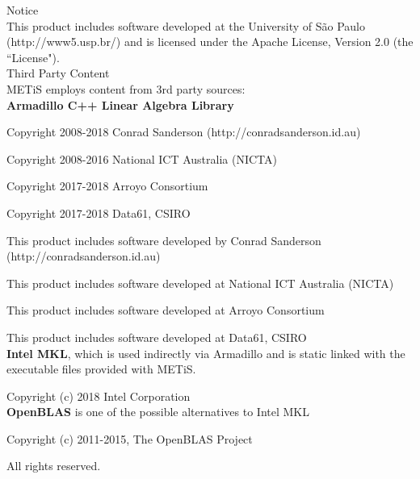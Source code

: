 {\selectfont \LARGE Notice} \\[8pt]
%
This product includes software developed at the University of São Paulo (http://www5.usp.br/) and is licensed under the Apache License, Version 2.0 (the ``License"). \\[24pt]




{ \selectfont\LARGE Third Party Content} \\[8pt]
METiS employs content from 3rd party sources: \\[16pt]
%
\textbf{Armadillo C++ Linear Algebra Library}

Copyright 2008-2018 Conrad Sanderson (http://conradsanderson.id.au)

Copyright 2008-2016 National ICT Australia (NICTA)

Copyright 2017-2018 Arroyo Consortium

Copyright 2017-2018 Data61, CSIRO

This product includes software developed by Conrad Sanderson 
(http://conradsanderson.id.au)

This product includes software developed at National ICT Australia (NICTA)

This product includes software developed at Arroyo Consortium

This product includes software developed at Data61, CSIRO \\[24pt]
%
%
%
\textbf{Intel MKL}, which is used indirectly via Armadillo and is static linked with the executable files provided with METiS.

Copyright (c) 2018 Intel Corporation\\[24pt]
%
%
%
\textbf{OpenBLAS} is one of the possible alternatives to Intel MKL

Copyright (c) 2011-2015, The OpenBLAS Project 

All rights reserved.
